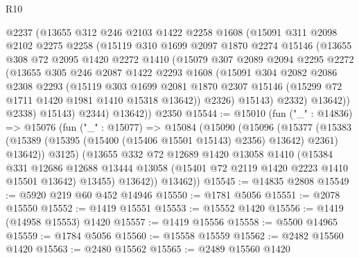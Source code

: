 \begin{lexlean}{R10}
\begin{coremodule}
          @2237
          (@13655
            @312
            @246
            @2103
            @1422
            @2258
            @1608
            (@15091
              @311
              @2098
              @2102
              @2275
              @2258
              (@15119
                @310
                @1699
                @2097
                @1870
                @2274
                @15146
                (@13655
                  @308
                  @72
                  @2095
                  @1420
                  @2272
                  @1410
                  (@15079
                    @307
                    @2089
                    @2094
                    @2295
                    @2272
                    (@13655
                      @305
                      @246
                      @2087
                      @1422
                      @2293
                      @1608
                      (@15091
                        @304
                        @2082
                        @2086
                        @2308
                        @2293
                        (@15119
                          @303
                          @1699
                          @2081
                          @1870
                          @2307
                          @15146
                          (@15299 @72 @1711 @1420 @1981 @1410 @15318 @13642))
                        @2326)
                      @15143)
                    @2332)
                  @13642))
              @2338)
            @15143)
          @2344)
        @13642))
    @2350
@15544 := @15010
    (fun ("_" : @14836) =>
    @15076
      (fun ("_" : @15077) =>
      @15084
        (@15090
          (@15096
            (@15377
              (@15383 (@15389 (@15395 (@15400 (@15406 @15501 @15143) @2356) @13642) @2361) @13642))
            @3125)
          (@13655
            @332
            @72
            @12689
            @1420
            @13058
            @1410
            (@15384
              @331
              @12686
              @12688
              @13444
              @13058
              (@15401 @72 @2119 @1420 @2223 @1410 @15501 @13642)
              @13455)
            @13642))
        @13462))
@15545 := @14835 @2808
@15549 := @5920 @219 @60 @452 @14946
@15550 := @1781 @5056
@15551 := @2078 @15550
@15552 := @1419 @15551
@15553 := @15552 @1420
@15556 := @1419 (@14958 @15553) @1420
@15557 := @1419 @15556
@15558 := @5500 @14965
@15559 := @1784 @5056
@15560 := @15558 @15559
@15562 := @2482 @15560 @1420
@15563 := @2480 @15562
@15565 := @2489 @15560 @1420

\end{coremodule}
\end{lexlean}
